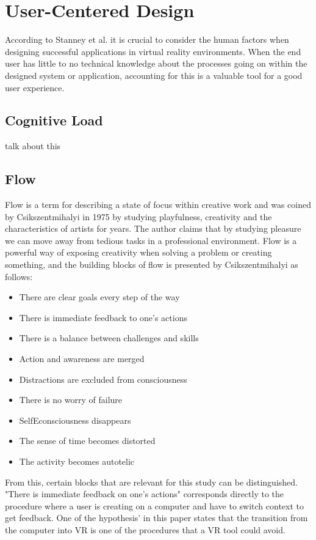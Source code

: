 \section{User-Centered Design}
According to Stanney et al. it is crucial to consider the human factors when designing successful applications in virtual reality environments. When the end user has little to no technical knowledge about the processes going on within the designed system or application, accounting for this is a valuable tool for a good user experience.
\cite{UCD:stanney1998human}
\subsection{Cognitive Load}
talk about this
\subsection{Flow}
Flow is a term for describing a state of focus within creative work and was coined by Csikszentmihalyi in 1975 by studying playfulness, creativity and the characteristics of artists for years. \cite{UCD:boredom1975anxiety} The author claims that by studying pleasure we can move away from tedious tasks in a professional environment. Flow is a powerful way of exposing creativity when solving a problem or creating something, and the building blocks of flow is presented by Csikszentmihalyi as follows:\cite{UCD:csikszentmihalyi1996flow}

\begin{itemize}
  \item There are clear goals every step of the way
  \item There is immediate feedback to one's actions
  \item There is a balance between challenges and skills
  \item Action and awareness are merged
  \item Distractions are excluded from consciousness
  \item There is no worry of failure
  \item SelfEconsciousness disappears
  \item The sense of time becomes distorted
  \item The activity becomes autotelic
\end{itemize}

From this, certain blocks that are relevant for this study can be distinguished. "There is immediate feedback on one's actions" corresponds directly to the procedure where a user is creating on a computer and have to switch context to get feedback. One of the hypothesis' in this paper states that the transition from the computer into VR is one of the procedures that a VR tool could avoid.
